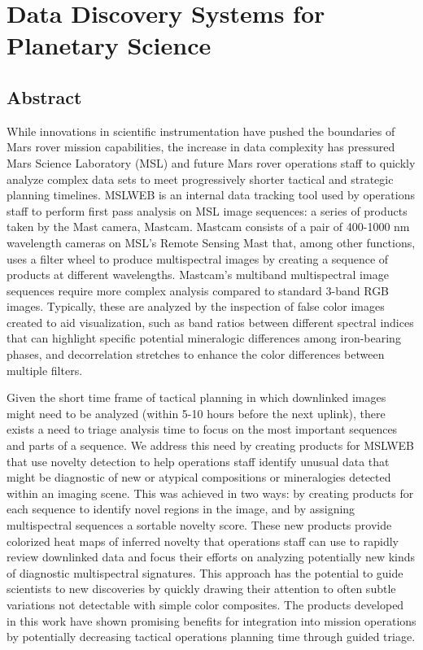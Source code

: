\chapter[Data Discovery Systems for Planetary Science]{Data Discovery Systems for Planetary Science}
\section{Abstract}
While innovations in scientific instrumentation have pushed the boundaries of Mars rover mission capabilities, the increase in data complexity has pressured Mars Science Laboratory (MSL) and future Mars rover operations staff to quickly analyze complex data sets to meet progressively shorter tactical and strategic planning timelines. 
MSLWEB is an internal data tracking tool used by operations staff to perform first pass analysis on MSL image sequences: a series of products taken by the Mast camera, Mastcam. Mastcam consists of a pair of 400-1000 nm wavelength cameras on MSL's Remote Sensing Mast that, among other functions, uses a filter wheel to produce multispectral images by creating a sequence of products at different wavelengths. 
Mastcam's multiband multispectral image sequences require more complex analysis compared to standard 3-band RGB images. 
Typically, these are analyzed by the inspection of false color images created to aid visualization, such as band ratios between different spectral indices that can highlight specific potential mineralogic differences among iron-bearing phases, and decorrelation stretches to enhance the color differences between multiple filters. 

Given the short time frame of tactical planning in which downlinked images might need to be analyzed (within 5-10 hours before the next uplink), there exists a need to triage analysis time to focus on the most important sequences and parts of a sequence. 
We address this need by creating products for MSLWEB that use novelty detection to help operations staff identify unusual data that might be diagnostic of new or atypical compositions or mineralogies detected within an imaging scene. 
This was achieved in two ways: by creating products for each sequence to identify novel regions in the image, and by assigning multispectral sequences a sortable novelty score. 
These new products provide colorized heat maps of inferred novelty that operations staff can use to rapidly review downlinked data and focus their efforts on analyzing potentially new kinds of diagnostic multispectral signatures. 
This approach has the potential to guide scientists to new discoveries by quickly drawing their attention to often subtle variations not detectable with simple color composites.
The products developed in this work have shown promising benefits for integration into mission operations by potentially decreasing tactical operations planning time through guided triage.
